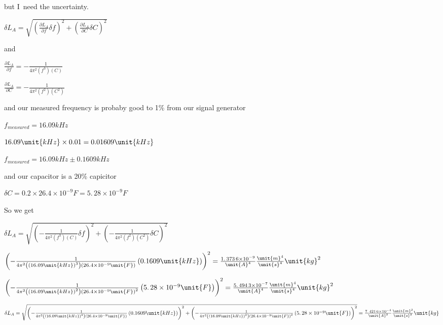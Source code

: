 \documentclass{sebase}
\begin{document}
but I\ need the uncertainty.

$\delta L_{A}=\sqrt{\left( \frac{\partial L_{A}}{\partial f}\delta f\right)
^{2}+\left( \frac{\partial L_{A}}{\partial C}\delta C\right) ^{2}}$

and 

$\frac{\partial L_{A}}{\partial f}=-\frac{1}{4\pi ^{2}\left( f^{3}\right)
\left( C\right) }$

$\frac{\partial L_{A}}{\partial C}=-\frac{1}{4\pi ^{2}\left( f^{2}\right)
\left( C^{2}\right) }$

and our measured frequency is probaby good to 1\% from our signal generator

$f_{measured}=16.09\unit{kHz}$

$16.09\unit{kHz}\times 0.01=\allowbreak \allowbreak 0.01\allowbreak 609\unit{%
kHz}$

\bigskip $f_{measured}=16.09\unit{kHz}\pm 0.\allowbreak 1\allowbreak 609%
\unit{kHz}$

and our capacitor is a 20\% capicitor

$\delta C=0.2\times 26.4\times 10^{-9}\unit{F}=\allowbreak 5.\,\allowbreak
28\times 10^{-9}\unit{F}$

So we get

$\delta L_{A}=\sqrt{\left( -\frac{1}{4\pi ^{2}\left( f^{3}\right) \left(
C\right) }\delta f\right) ^{2}+\left( -\frac{1}{4\pi ^{2}\left( f^{2}\right)
\left( C^{2}\right) }\delta C\right) ^{2}}$

\bigskip 

$\left( -\frac{1}{4\pi ^{2}\left( \left( 16.09\unit{kHz}\right) ^{3}\right)
\left( 26.4\times 10^{-9}\unit{F}\right) }\left( \allowbreak \allowbreak
0.1\allowbreak 609\unit{kHz}\right) \right) ^{2}=\allowbreak \frac{%
1.\,\allowbreak 373\,6\times 10^{-9}}{\unit{A}^{4}}\frac{\unit{m}^{4}}{\unit{%
s}^{4}}\unit{kg}^{2}$

\bigskip $\left( -\frac{1}{4\pi ^{2}\left( \left( 16.09\unit{kHz}\right)
^{2}\right) \left( 26.4\times 10^{-9}\unit{F}\right) ^{2}}\left( \allowbreak
5.\,\allowbreak 28\times 10^{-9}\unit{F}\right) \right) ^{2}=\allowbreak 
\frac{5.\,\allowbreak 494\,3\times 10^{-7}}{\unit{A}^{4}}\frac{\unit{m}^{4}}{%
\unit{s}^{4}}\unit{kg}^{2}$

$\delta L_{A}=\sqrt{\left( -\frac{1}{4\pi ^{2}\left( \left( 16.09\unit{kHz}%
\right) ^{3}\right) \left( 26.4\times 10^{-9}\unit{F}\right) }\left(
\allowbreak 0.1\allowbreak 609\unit{kHz}\right) \right) ^{2}+\left( -\frac{1%
}{4\pi ^{2}\left( \left( 16.09\unit{kHz}\right) ^{2}\right) \left(
26.4\times 10^{-9}\unit{F}\right) ^{2}}\left( \allowbreak 5.\,\allowbreak
28\times 10^{-9}\unit{F}\right) \right) ^{2}}=\allowbreak \frac{%
7.\,\allowbreak 421\,6\times 10^{-4}}{\unit{A}^{2}}\frac{\unit{m}^{2}}{\unit{%
s}^{2}}\unit{kg}$
\end{document}
